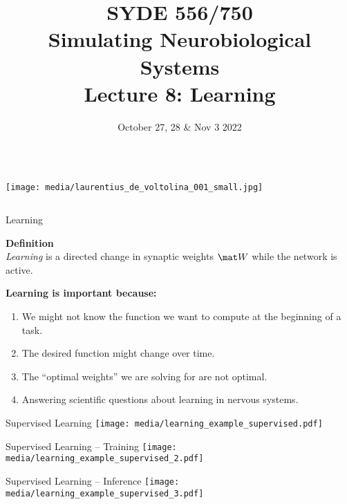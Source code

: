\documentclass[handout,aspectratio=169]{beamer}
\date{October 27, 28 \& Nov 3 2022}
\title{SYDE 556/750 \\ Simulating Neurobiological Systems \\ Lecture 8: Learning}
\begin{document}
	
	\begin{frame}{}
		\vspace{0.5cm}
		\begin{columns}[c]
			\MakeTitle
			\texttt{[image: media/laurentius\_de\_voltolina\_001\_small.jpg]}
		\end{columns}
	\end{frame}

  \begin{frame}{Learning}
    \begin{mdframed}
      \textbf{Definition}\\
      \emph{Learning} is a directed change in synaptic weights $\mat W$ while the network is active.
    \end{mdframed}  
    \vspace{.75cm}
    \textbf{Learning is important because:}
    \begin{enumerate}
      \item <2->We might not know the function we want to compute at the beginning of a task.
      \item <3->The desired function might change over time.
      \item <4->The \enquote{optimal weights} we are solving for are not optimal.
      \item <5->Answering scientific questions about learning in nervous systems.
    \end{enumerate}
	\end{frame}

	\begin{frame}{Supervised Learning}
		\centering
		\texttt{[image: media/learning\_example\_supervised.pdf]}
	\end{frame}

	\begin{frame}{Supervised Learning -- Training}
		\centering
		\texttt{[image: media/learning\_example\_supervised\_2.pdf]}
	\end{frame}

	\begin{frame}{Supervised Learning -- Inference}
		\centering
		\texttt{[image: media/learning\_example\_supervised\_3.pdf]}
	\end{frame}
\end{document}
